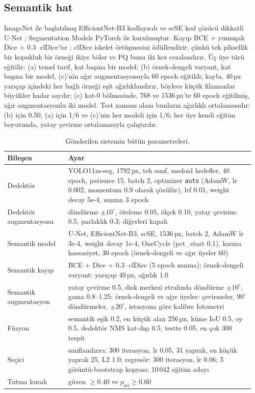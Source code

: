 \documentclass[sigconf]{acmart}
\begin{document}
\subsection{Semantik hat}
ImageNet ile başlatılmış \cite{deng2009imagenet} EfficientNet-B3 kodlayıcılı \cite{tan2019efficientnet} ve scSE kod çözücü dikkatli \cite{roy2018scse} U-Net \cite{ronneberger2015unet}; Segmentation Models PyTorch \cite{smp} ile kurulmuştur. Kayıp BCE + yumuşak Dice + $0.3\cdot$clDice'tır \cite{shit2021cldice}; clDice iskelet örtüşmesini ödüllendirir, çünkü tek piksellik bir kopukluk bir örneği ikiye böler ve PQ bunu iki kez cezalandırır. Üç üye türü eğitilir: (a) temel tarif, kat başına bir model; (b) örnek-dengeli varyant, kat başına bir model, (c)'nin ağır augmentasyonuyla 60 epoch eğitildi; kaybı, 40\,px yarıçap içindeki her bağlı örneği eşit ağırlıklandırır, böylece küçük filamanlar büyükler kadar sayılır; (c) kat-0 bölmesinde, 768 ve 1536\,px'te 60 epoch eğitilmiş, ağır augmentasyonlu iki model. Test zamanı alanı bunların ağırlıklı ortalamasıdır: (b) için 0.50, (a) için 1/6 ve (c)'nin her modeli için 1/6; her üye kendi eğitim boyutunda, yatay çevirme ortalamasıyla çalıştırılır.

\begin{table}[t]
  \caption{Gönderilen sistemin bütün parametreleri.}
  \label{tab:params}
  \small
  \begin{tabular}{@{}p{}p{}@{}}
    \toprule
    Bileşen & Ayar \\
    \midrule
    Dedektör & YOLO11m-seg, 1792\,px, tek sınıf, medoid hedefler, 40 epoch, patience 15, batch 2, optimizer \texttt{auto} (AdamW, lr 0.002, momentum 0.9 olarak çözülür), lrf 0.01, weight decay 5e-4, ısınma 3 epoch \\
    Dedektör augmentasyonu & döndürme $\pm10^\circ$, öteleme 0.05, ölçek 0.10, yatay çevirme 0.5, parlaklık 0.3; diğerleri kapalı \\
    Semantik model & U-Net, EfficientNet-B3, scSE, 1536\,px, batch 2, AdamW lr 3e-4, weight decay 1e-4, OneCycle (pct\_start 0.1), karma hassasiyet, 30 epoch (örnek-dengeli ve ağır üyeler 60) \\
    Semantik kayıp & BCE + Dice + $0.3\cdot$clDice (5 epoch ısınma); örnek-dengeli varyant: yarıçap 40\,px, ağırlık 1.0 \\
    Semantik augmentasyon & yatay çevirme 0.5, disk merkezi etrafında döndürme $\pm10^\circ$, gama 0.8--1.25; örnek-dengeli ve ağır üyeler: çevirmeler, $90^\circ$ döndürmeler, $\pm20^\circ$, istasyona göre kalibre fotometri \\
    Füzyon & semantik eşik 0.2, en küçük alan 256\,px, küme IoU 0.5, oy 0.5, dedektör NMS kat-dışı 0.5, testte 0.05, en çok 300 tespit \\
    Seçici & sınıflandırıcı: 300 iterasyon, lr 0.05, 31 yaprak, en küçük yaprak 25, L2 1.0; regresör: 300 iterasyon, lr 0.06; 5 görüntü-bootstrap kopyası; 10\,042 eğitim adayı \\
    Tutma kuralı & güven $\geq 0.40$ ve $p_\mathrm{sel}\geq 0.60$ \\
    \bottomrule
  \end{tabular}
\end{table}
\end{document}
